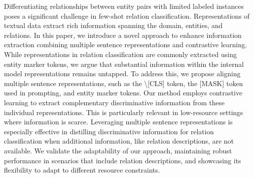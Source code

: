 Differentiating relationships between entity pairs with limited labeled instances poses a significant challenge in few-shot relation classification. Representations of textual data extract rich information spanning the domain, entities, and relations. In this paper, we introduce a novel approach to enhance information extraction combining multiple sentence representations and contrastive learning. While representations in relation classification are commonly extracted using entity marker tokens, we argue that substantial information within the internal model representations remains untapped. To address this, we propose aligning multiple sentence representations, such as the \textbackslash{}[CLS] token, the [MASK] token used in prompting, and entity marker tokens. Our method employs contrastive learning to extract complementary discriminative information from these individual representations. This is particularly relevant in low-resource settings where information is scarce. Leveraging multiple sentence representations is especially effective in distilling discriminative information for relation classification when additional information, like relation descriptions, are not available. We validate the adaptability of our approach, maintaining robust performance in scenarios that include relation descriptions, and showcasing its flexibility to adapt to different resource constraints.